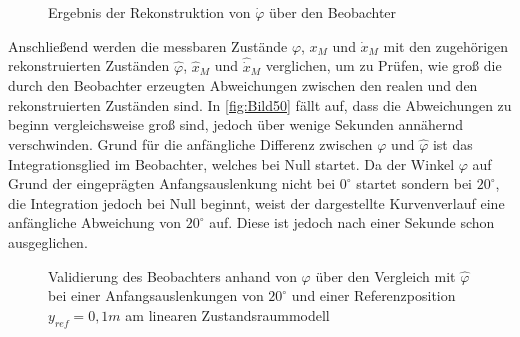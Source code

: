 \begin{figure}[H]
    \centering
    \caption[Rekonstruktion $\dot{\varphi}$]{Ergebnis der Rekonstruktion von $\dot{\varphi}$ über den Beobachter}
    \label{fig:Bild49}
\end{figure}

Anschließend werden die messbaren Zustände $\varphi$, $x_M$ und $\dot{x}_M$ mit den zugehörigen rekonstruierten Zuständen $\hat{\varphi}$, $\hat{x}_M$ und $\hat{\dot{x}}_M$ verglichen, um zu Prüfen, wie groß die durch den Beobachter erzeugten Abweichungen zwischen den realen und den rekonstruierten Zuständen sind. In \autoref{fig:Bild50} fällt auf, dass die Abweichungen zu beginn vergleichsweise groß sind, jedoch über wenige Sekunden annähernd verschwinden. Grund für die anfängliche Differenz zwischen $\varphi$ und $\hat{\varphi}$ ist das Integrationsglied im Beobachter, welches bei Null startet. Da der Winkel $\varphi$ auf Grund der eingeprägten Anfangsauslenkung nicht bei $0^\circ$ startet sondern bei $20^\circ$, die Integration jedoch bei Null beginnt, weist der dargestellte Kurvenverlauf eine anfängliche Abweichung von $20^\circ$ auf. Diese ist jedoch nach \ca einer Sekunde schon ausgeglichen. 

\begin{figure}[H]
    \centering
    \caption[Vergleich $\varphi$, $\hat{\varphi}$]{Validierung des Beobachters anhand von $\varphi$ über den Vergleich mit $\hat{\varphi}$ bei einer Anfangsauslenkungen von $20^\circ$ und einer Referenzposition $y_{ref} = 0,1 m$ am linearen Zustandsraummodell}
    \label{fig:Bild50}
\end{figure}

